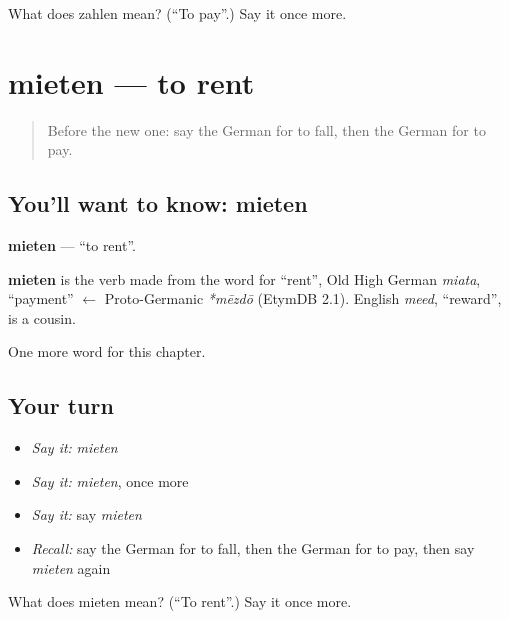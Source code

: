 \begin{tcolorbox}[breakable,colback=teal!4,colframe=teal!35!black,title={Before you move on}]
What does zahlen mean? (\textquotedblleft{}To pay\textquotedblright{}.) Say it once more.
\end{tcolorbox}
\section[mieten]{mieten — to rent}

\label{lesson:GE-C141-mieten}



\begin{quote}
Before the new one: say the German for to fall, then the German for to pay.
\end{quote}

\subsection*{You'll want to know: mieten}
\textbf{mieten} — \textquotedblleft{}to rent\textquotedblright{}.

\begin{cousinweb}
\textbf{mieten} is the verb made from the word for \textquotedblleft{}rent\textquotedblright{}, Old High German \emph{miata}, \textquotedblleft{}payment\textquotedblright{} $\leftarrow$ Proto-Germanic \emph{*mēzdō} (EtymDB 2.1). English \emph{meed}, \textquotedblleft{}reward\textquotedblright{}, is a cousin.
\end{cousinweb}

\begin{grammarlens}[title={What you've built}]
One more word for this chapter.
\end{grammarlens}

\subsection*{Your turn}
\begin{itemize}
\raggedright
  \item \emph{Say it:} \emph{mieten}
  \item \emph{Say it:} \emph{mieten}, once more
  \item \emph{Say it:} say \emph{mieten}
  \item \emph{Recall:} say the German for to fall, then the German for to pay, then say \emph{mieten} again
\end{itemize}

\begin{tcolorbox}[breakable,colback=teal!4,colframe=teal!35!black,title={Before you move on}]
What does mieten mean? (\textquotedblleft{}To rent\textquotedblright{}.) Say it once more.
\end{tcolorbox}
